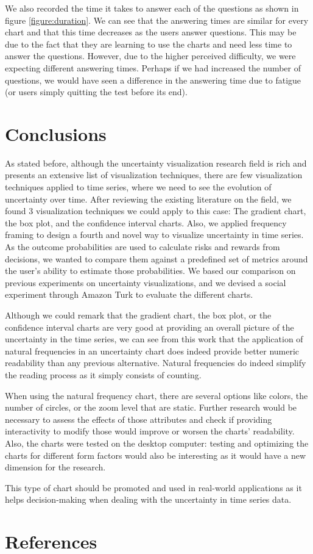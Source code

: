 \documentclass[a4paper,3p,sort&compress]{elsarticle}
\begin{document}
We also recorded the time it takes to answer each of the questions as shown in figure \ref{figure:duration}. We
can see that the answering times are similar for every chart and that this time decreases as the users answer questions.
This may be due to the fact that they are learning to use the charts and need less time to answer the questions.
However, due to the higher perceived difficulty, we were expecting different answering times. Perhaps if we had
increased the number of questions, we would have seen a difference in the answering time due to fatigue (or users simply quitting the test
before its end).


\section{Conclusions}
\label{sec:concl}

As stated before, although the uncertainty visualization research field is rich and presents an extensive list of visualization techniques,
there are few
visualization techniques applied to time series, where we need to see the evolution of uncertainty
over time. After reviewing the existing literature on the field, we found 3 visualization techniques we could apply to this case:
The gradient chart, the box plot, and the confidence interval charts. Also, we applied frequency framing
to design a fourth and novel way to visualize uncertainty in time series.
As the outcome probabilities are used to calculate risks and rewards from decisions, we wanted to compare them against a predefined set of
metrics around the user's ability to estimate those probabilities.
We based our comparison on previous experiments on uncertainty visualizations, and we devised a social experiment through Amazon Turk to
evaluate the different charts.

Although we could remark that the gradient chart, the box plot, or the confidence interval charts are very good at
providing an overall picture of the uncertainty in the time series, we can see from this work that the application of natural
frequencies in an uncertainty chart does indeed
provide better numeric readability than any previous alternative. Natural frequencies do indeed simplify
the reading process as it simply consists of counting.

When using the natural frequency chart, there are several options like colors, the number of circles, or the
zoom level that are static. Further research would be necessary to assess the effects of those
attributes and check if providing interactivity to modify those would improve or worsen the charts' readability.
Also, the charts were tested on the desktop computer: testing and optimizing the charts for different form factors
would also be interesting as it would have a new dimension for the research.

This type of chart should be promoted and used in real-world applications as it helps decision-making when
dealing with the uncertainty in time series data.

\section{References}
\label{sec:ref}



\end{document}
